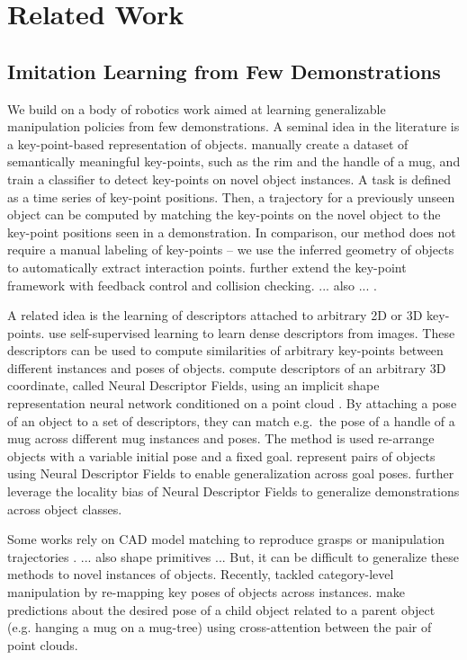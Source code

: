 \documentclass{article}
\begin{document}
\section{Related Work}

\subsection{Imitation Learning from Few Demonstrations} 

We build on a body of robotics work aimed at learning generalizable manipulation policies from few demonstrations. A seminal idea in the literature is a key-point-based representation of objects. \citet{manuelli19kpam} manually create a dataset of semantically meaningful key-points, such as the rim and the handle of a mug, and train a classifier to detect key-points on novel object instances. A task is defined as a time series of key-point positions. Then, a trajectory for a previously unseen object can be computed by matching the key-points on the novel object to the key-point positions seen in a demonstration. In comparison, our method does not require a manual labeling of key-points -- we use the inferred geometry of objects to automatically extract interaction points. \citet{gao21kpam,gao21kpamsc} further extend the key-point framework with feedback control and collision checking. ... also ... \cite{1910,vecerik20s3k,manuelli20keypoints,turpin21gift}.

A related idea is the learning of descriptors attached to arbitrary 2D or 3D key-points. \citet{florence18dense} use self-supervised learning to learn dense descriptors from images. These descriptors can be used to compute similarities of arbitrary key-points between different instances and poses of objects. \citet{chen22neural} compute descriptors of an arbitrary 3D coordinate, called Neural Descriptor Fields, using an implicit shape representation neural network conditioned on a point cloud \cite{mescheder19occupancy}. By attaching a pose of an object to a set of descriptors, they can match e.g.~the pose of a handle of a mug across different mug instances and poses. The method is used re-arrange objects with a variable initial pose and a fixed goal. \citet{simeonov22se} represent pairs of objects using Neural Descriptor Fields to enable generalization across goal poses. \citet{chun23local} further leverage the locality bias of Neural Descriptor Fields to generalize demonstrations across object classes.

Some works rely on CAD model matching to reproduce grasps or manipulation trajectories  \cite{klank09realtime,brook11collaborative,beetz11robotic,jakel12learning}. ... also shape primitives \cite{miller03automatic} ... But, it can be difficult to generalize these methods to novel instances of objects. Recently, \citet{wen22you} tackled category-level manipulation by re-mapping key poses of objects across instances. \citet{pan22taxpose} make predictions about the desired pose of a child object related to a parent object (e.g. hanging a mug on a mug-tree) using cross-attention \cite{vaswani17attention} between the pair of point clouds.
\end{document}
